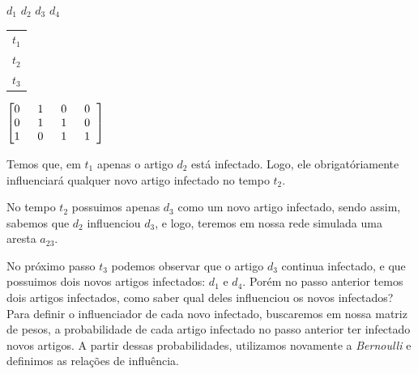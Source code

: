 \documentclass[a4paper,12pt]{article}
\begin{document}
  \begin{center}
  \hspace{0.67cm}$d_{1}$ \hspace{0.3cm}$d_{2}$ \hspace{0.3cm}$d_{3}$ \hspace{0.3cm}$d_{4}$

  \vspace{0.2cm}

  \begin{tabular}{c}
    $t_{1}$ \\
    $t_{2}$ \\
    $t_{3}$
  \end{tabular}
  $
  \begin{bmatrix}
    0\hspace{0.2cm} & 1\hspace{0.2cm} & 0\hspace{0.2cm}& 0\hspace{0.2cm}\\
    0\hspace{0.2cm} & 1\hspace{0.2cm} & 1\hspace{0.2cm} & 0\hspace{0.2cm}\\
    1\hspace{0.2cm} & 0\hspace{0.2cm} & 1\hspace{0.2cm} & 1\hspace{0.2cm}
  \end{bmatrix}
  $

  \end{center}
  
  Temos que, em $t_{1}$ apenas o artigo $d_{2}$ está infectado. Logo, ele obrigatóriamente influenciará qualquer novo artigo infectado
  no tempo $t_{2}$. 
  
  No tempo $t_{2}$ possuimos apenas $d_{3}$ como um novo artigo infectado, sendo assim, sabemos que $d_{2}$ influenciou $d_{3}$, e logo,
  teremos em nossa rede simulada uma aresta $a_{23}$.
  
  No próximo passo $t_{3}$ podemos observar que o artigo $d_{3}$ continua infectado, e que possuimos dois novos artigos infectados:
  $d_{1}$ e $d_{4}$. Porém no passo anterior temos dois artigos infectados, como saber qual deles influenciou os novos infectados?
  Para definir o influenciador de cada novo infectado, buscaremos em nossa matriz de pesos, a probabilidade de cada artigo infectado
  no passo anterior ter infectado novos artigos. A partir dessas probabilidades, utilizamos novamente a \textit{Bernoulli} e definimos
  as relações de influência. 
  
\end{document}
